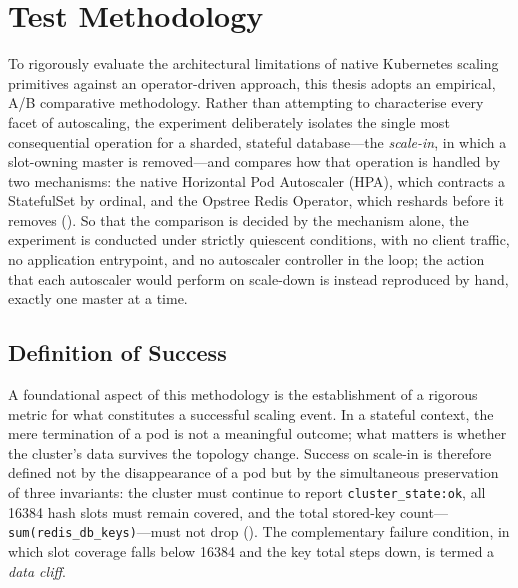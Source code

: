 \section{Test Methodology}

To rigorously evaluate the architectural limitations of native Kubernetes scaling primitives against an operator-driven approach, this thesis adopts an empirical, A/B comparative methodology. Rather than attempting to characterise every facet of autoscaling, the experiment deliberately isolates the single most consequential operation for a sharded, stateful database---the \emph{scale-in}, in which a slot-owning master is removed---and compares how that operation is handled by two mechanisms: the native Horizontal Pod Autoscaler (\ac{HPA}), which contracts a StatefulSet by ordinal, and the Opstree Redis Operator, which reshards before it removes (\cite{opstree_redis}). So that the comparison is decided by the mechanism alone, the experiment is conducted under strictly quiescent conditions, with no client traffic, no application entrypoint, and no autoscaler controller in the loop; the action that each autoscaler would perform on scale-down is instead reproduced by hand, exactly one master at a time.

\subsection{Definition of Success}
A foundational aspect of this methodology is the establishment of a rigorous metric for what constitutes a successful scaling event. In a stateful context, the mere termination of a pod is not a meaningful outcome; what matters is whether the cluster's data survives the topology change. Success on scale-in is therefore defined not by the disappearance of a pod but by the simultaneous preservation of three invariants: the cluster must continue to report \texttt{cluster\_state:ok}, all \num{16384} hash slots must remain covered, and the total stored-key count---\texttt{sum(redis\_db\_keys)}---must not drop (\cite{redis_cluster_spec}). The complementary failure condition, in which slot coverage falls below \num{16384} and the key total steps down, is termed a \emph{data cliff}.

